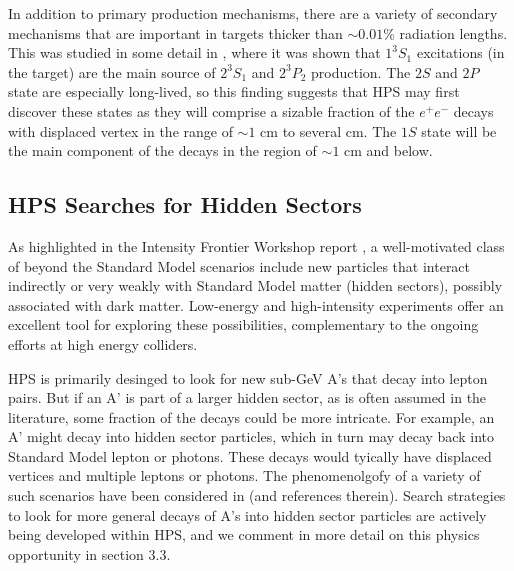 In addition to primary production mechanisms, there are a variety of secondary mechanisms
that are important in targets thicker than $\sim0.01\%$ radiation lengths.
This was studied in some detail in \cite{Banburski:2012tk}, where it was 
shown that $1^3S_1$ excitations (in the target) are the main source of 
$2^3S_1$ and $2^3P_2$ production.
The $2S$ and $2P$ state are especially long-lived, so this finding
suggests that HPS may first discover these states as they will comprise 
a sizable fraction of the $e^+e^-$ decays with displaced vertex in the range of $\sim 1$ cm to several cm. 
The $1S$ state will be the main component of the decays in the region of  $\sim 1$ cm and below. 

\subsection{HPS Searches for Hidden Sectors}

As highlighted in the Intensity Frontier Workshop report \cite{Hewett:2012ns},
a well-motivated class of beyond the Standard Model scenarios include new particles that interact
indirectly or very weakly with Standard Model matter (hidden sectors), possibly associated with dark matter. 
Low-energy and high-intensity experiments offer an excellent tool for exploring these
possibilities, complementary to the ongoing efforts at high energy colliders. 

HPS is primarily desinged to look for new sub-GeV A's that decay into lepton pairs.
But if an A' is part of a larger hidden sector, as is often assumed in the literature, 
some fraction of the decays could be more intricate.
For example, an A' might decay into hidden sector particles, which in turn may decay back into Standard Model lepton or photons.  
These decays would tyically have displaced vertices and multiple leptons or photons. The phenomenolgofy of a variety of such scenarios 
have been considered in \cite{Strassler:2006im, Essig:2009nc} (and references therein). 
Search strategies to look for more general decays of A's into hidden sector particles are actively being developed within HPS, 
and we comment in more detail on this physics opportunity in section 3.3.


